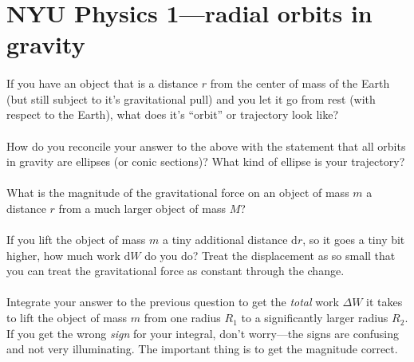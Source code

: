 \documentclass[12pt]{article}
\begin{document}
\newcommand{\kg}{\mathrm{kg}}
\newcommand{\m}{\mathrm{m}}
\newcommand{\km}{\mathrm{km}}
\newcommand{\s}{\mathrm{s}}
\newcommand{\mps}{\m\,\s^{-1}}
\newcommand{\dd}{\mathrm{d}}
\thispagestyle{empty}

\section*{NYU Physics 1---radial orbits in gravity}

\paragraph{\theproblem}%
If you have an object that is a distance $r$ from the center of mass
of the Earth (but still subject to it's gravitational pull) and you
let it go from rest (with respect to the Earth), what does it's
``orbit'' or trajectory look like?

\paragraph{\theproblem}%
How do you reconcile your answer to the above with the statement that
all orbits in gravity are ellipses (or conic sections)?  What kind of
ellipse is your trajectory?

\paragraph{\theproblem}%
What is the magnitude of the gravitational force on an object of mass
$m$ a distance $r$ from a much larger object of mass $M$?

\paragraph{\theproblem}%
If you lift the object of mass $m$ a tiny additional distance $\dd r$,
so it goes a tiny bit higher, how much work $\dd W$ do you do?
Treat the displacement as so small that you can treat the
gravitational force as constant through the change.

\paragraph{\theproblem}%
Integrate your answer to the previous question to get the \emph{total}
work $\Delta W$ it takes to lift the object of mass $m$ from one
radius $R_1$ to a significantly larger radius $R_2$.  If you get the
wrong \emph{sign} for your integral, don't worry---the signs are
confusing and not very illuminating.  The important thing is to get
the magnitude correct.
\end{document}
